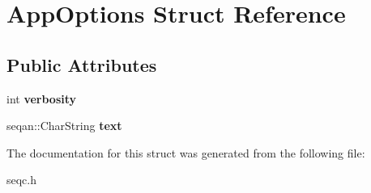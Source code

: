 \hypertarget{structAppOptions}{\section{\-App\-Options \-Struct \-Reference}
\label{structAppOptions}
}
\subsection*{\-Public \-Attributes}
\begin{DoxyCompactItemize}
\item 
\hypertarget{structAppOptions_a2bd7f5ce9e33dd08ef8d4aeebde2142f}{int {\bfseries verbosity}}\label{structAppOptions_a2bd7f5ce9e33dd08ef8d4aeebde2142f}

\item 
\hypertarget{structAppOptions_af450a75f80f860ee08617c59f007ba5c}{seqan\-::\-Char\-String {\bfseries text}}\label{structAppOptions_af450a75f80f860ee08617c59f007ba5c}

\end{DoxyCompactItemize}


\-The documentation for this struct was generated from the following file\-:\begin{DoxyCompactItemize}
\item 
seqc.\-h\end{DoxyCompactItemize}
